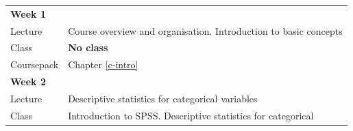 \documentclass[11pt,a4paper,openany]{book}
\begin{document}
\begin{longtable}[]{@{}ll@{}}
\toprule
\begin{minipage}[t]{0.19\columnwidth}\raggedright\strut
\textbf{Week 1}\strut
\end{minipage} & \begin{minipage}[t]{0.76\columnwidth}\raggedright\strut
\strut
\end{minipage}\tabularnewline
\begin{minipage}[t]{0.19\columnwidth}\raggedright\strut
Lecture\strut
\end{minipage} & \begin{minipage}[t]{0.76\columnwidth}\raggedright\strut
Course overview and organisation. Introduction to basic concepts\strut
\end{minipage}\tabularnewline
\begin{minipage}[t]{0.19\columnwidth}\raggedright\strut
Class\strut
\end{minipage} & \begin{minipage}[t]{0.76\columnwidth}\raggedright\strut
\textbf{No class}\strut
\end{minipage}\tabularnewline
\begin{minipage}[t]{0.19\columnwidth}\raggedright\strut
Coursepack\strut
\end{minipage} & \begin{minipage}[t]{0.76\columnwidth}\raggedright\strut
Chapter \ref{c-intro}\strut
\end{minipage}\tabularnewline
\begin{minipage}[t]{0.19\columnwidth}\raggedright\strut
\textbf{Week 2}\strut
\end{minipage} & \begin{minipage}[t]{0.76\columnwidth}\raggedright\strut
\strut
\end{minipage}\tabularnewline
\begin{minipage}[t]{0.19\columnwidth}\raggedright\strut
Lecture\strut
\end{minipage} & \begin{minipage}[t]{0.76\columnwidth}\raggedright\strut
Descriptive statistics for categorical variables\strut
\end{minipage}\tabularnewline
\begin{minipage}[t]{0.19\columnwidth}\raggedright\strut
Class\strut
\end{minipage} & \begin{minipage}[t]{0.76\columnwidth}\raggedright\strut
Introduction to SPSS. Descriptive statistics for categorical

\end{minipage}
\end{longtable}
\end{document}
